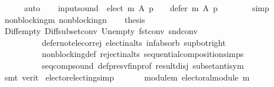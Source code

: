\begin{isabellebody}
\ \ \ \ \isamarkupfalse%
\ auto\isanewline
\ \ \isamarkupfalse%
\ {\isachardoublequoteopen}{\isacharquery}{\kern0pt}input{\isacharunderscore}{\kern0pt}sound\ {\isasymlongrightarrow}\ {\isacharparenleft}{\kern0pt}elect\ m\ A\ p\ {\isasymnoteq}\ {\isacharbraceleft}{\kern0pt}{\isacharbraceright}{\kern0pt}\ {\isasymor}\ defer\ m\ A\ p\ {\isasymnoteq}\ {\isacharbraceleft}{\kern0pt}{\isacharbraceright}{\kern0pt}{\isacharparenright}{\kern0pt}{\isachardoublequoteclose}\isanewline
\ \ \ \ \isamarkupfalse%
\ simp\isanewline
\ \ \isamarkupfalse%
\ non{\isacharunderscore}{\kern0pt}blocking{\isacharunderscore}{\kern0pt}m\ non{\isacharunderscore}{\kern0pt}blocking{\isacharunderscore}{\kern0pt}n\isanewline
\ \ \isamarkupfalse%
\ {\isacharquery}{\kern0pt}thesis\isanewline
\ \ \ \ \isamarkupfalse%
\ Diff{\isacharunderscore}{\kern0pt}empty\ Diff{\isacharunderscore}{\kern0pt}subset{\isacharunderscore}{\kern0pt}conv\ Un{\isacharunderscore}{\kern0pt}empty\ fst{\isacharunderscore}{\kern0pt}conv\ snd{\isacharunderscore}{\kern0pt}conv\isanewline
\ \ \ \ \ \ \ \ \ \ defer{\isacharunderscore}{\kern0pt}not{\isacharunderscore}{\kern0pt}elec{\isacharunderscore}{\kern0pt}or{\isacharunderscore}{\kern0pt}rej\ elect{\isacharunderscore}{\kern0pt}in{\isacharunderscore}{\kern0pt}alts\ inf{\isachardot}{\kern0pt}absorb{}\ sup{\isacharunderscore}{\kern0pt}bot{\isacharunderscore}{\kern0pt}right\isanewline
\ \ \ \ \ \ \ \ \ \ non{\isacharunderscore}{\kern0pt}blocking{\isacharunderscore}{\kern0pt}def\ reject{\isacharunderscore}{\kern0pt}in{\isacharunderscore}{\kern0pt}alts\ sequential{\isacharunderscore}{\kern0pt}composition{\isachardot}{\kern0pt}simps\isanewline
\ \ \ \ \ \ \ \ \ \ seq{\isacharunderscore}{\kern0pt}comp{\isacharunderscore}{\kern0pt}sound\ def{\isacharunderscore}{\kern0pt}presv{\isacharunderscore}{\kern0pt}fin{\isacharunderscore}{\kern0pt}prof\ result{\isacharunderscore}{\kern0pt}disj\ subset{\isacharunderscore}{\kern0pt}antisym\isanewline
\ \ \ \ \isamarkupfalse%
\ {\isacharparenleft}{\kern0pt}smt\ {\isacharparenleft}{\kern0pt}verit{\isacharparenright}{\kern0pt}{\isacharparenright}{\kern0pt}\isanewline
{}\isamarkupfalse%
%
\endisatagproof
{\isafoldproof}%
%
\isadelimproof
\isanewline
%
\endisadelimproof
\isanewline
{}\isamarkupfalse%
\ elector{\isacharunderscore}{\kern0pt}electing{\isacharbrackleft}{\kern0pt}simp{\isacharbrackright}{\kern0pt}{\isacharcolon}{\kern0pt}\isanewline
\ \ \isanewline
\ \ \ \ module{\isacharunderscore}{\kern0pt}m{\isacharcolon}{\kern0pt}\ {\isachardoublequoteopen}electoral{\isacharunderscore}{\kern0pt}module\ m{\isachardoublequoteclose}\ \isanewline

\end{isabellebody}

